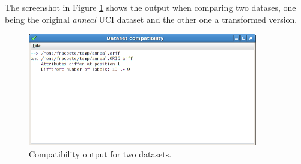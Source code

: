 The screenshot in Figure \ref{dataset-compatibility} shows the output when
comparing two datases, one being the original \textit{anneal} UCI dataset
and the other one a transformed version.

\begin{figure}[htb]
  \centering
  \includegraphics[width=10.0cm]{images/dataset-compatibility.png}
  \caption{Compatibility output for two datasets.}
  \label{dataset-compatibility}
\end{figure}
